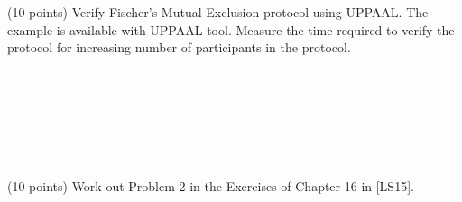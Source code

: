 \documentclass[a4paper, 12pt]{article}
\begin{document}
\newpage
\begin{problem}{}
(10 points) 
%
Verify Fischer's Mutual Exclusion protocol using UPPAAL. The example is available with UPPAAL tool. Measure the time required to verify the protocol for increasing number of participants in the protocol. \\ \\
\begin{minipage}{1\textwidth}
		\rectangle{\linewidth}{23cm}
\end{minipage}
\newpage
\ \\
\begin{minipage}{1\textwidth}
		\rectangle{\linewidth}{24cm}
\end{minipage}
\newpage
\ \\
\begin{minipage}{1\textwidth}
		\rectangle{\linewidth}{24cm}
\end{minipage}
\newpage
\ \\
\begin{minipage}{1\textwidth}
		\rectangle{\linewidth}{24cm}
\end{minipage}
\end{problem}


\newpage
\begin{problem}{}
(10 points) Work out Problem 2 in the Exercises of Chapter 16 in [LS15]. \\ \\
\begin{minipage}{1\textwidth}
		\rectangle{\linewidth}{23cm}
\end{minipage}
\newpage
\ \\
\begin{minipage}{1\textwidth}
		\rectangle{\linewidth}{24cm}
\end{minipage}
\newpage
\ \\
\begin{minipage}{1\textwidth}
		\rectangle{\linewidth}{24cm}
\end{minipage}
\newpage
\ \\
\begin{minipage}{1\textwidth}
		\rectangle{\linewidth}{24cm}
\end{minipage}
\end{problem}
\end{document}
